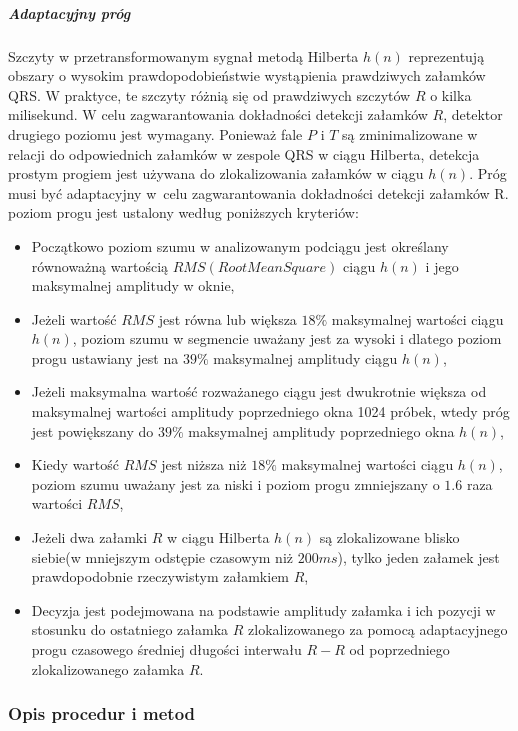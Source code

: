 \documentclass[a4paper, 11pt]{article}
\begin{document}
\subparagraph{Adaptacyjny próg}
Szczyty w przetransformowanym sygnał metodą Hilberta $h(n)$ reprezentują obszary o wysokim prawdopodobieństwie wystąpienia prawdziwych załamków QRS. W praktyce, te szczyty różnią się od prawdziwych szczytów $R$ o kilka milisekund. W celu zagwarantowania dokładności detekcji załamków $R$, detektor drugiego poziomu jest wymagany. Ponieważ fale $P$ i $T$ są zminimalizowane w relacji do odpowiednich załamków w zespole QRS w ciągu Hilberta, detekcja prostym progiem jest używana do zlokalizowania załamków w ciągu $h(n)$. Próg musi być adaptacyjny w~celu zagwarantowania dokładności detekcji załamków R.\\
poziom progu jest ustalony według poniższych kryteriów:
\begin{itemize}
		\item Początkowo poziom szumu w analizowanym podciągu jest określany równoważną wartością $RMS(Root Mean Square)$ ciągu $h(n)$ i jego maksymalnej amplitudy w oknie, 
		\item Jeżeli wartość $RMS$ jest równa lub większa $18\%$ maksymalnej wartości ciągu $h(n)$, poziom szumu w segmencie uważany jest za wysoki i dlatego poziom progu ustawiany jest na $39\%$ maksymalnej amplitudy ciągu $h(n)$,  
		\item Jeżeli maksymalna wartość rozważanego ciągu jest dwukrotnie większa od maksymalnej wartości amplitudy poprzedniego okna 1024 próbek, wtedy próg jest powiększany do $39\%$ maksymalnej amplitudy poprzedniego okna $h(n)$, 
		\item Kiedy wartość $RMS$ jest niższa niż $18\%$ maksymalnej wartości ciągu $h(n)$, poziom szumu uważany jest za niski i poziom progu zmniejszany o $1.6$ raza wartości $RMS$,
		\item Jeżeli dwa załamki $R$ w ciągu Hilberta $h(n)$ są zlokalizowane blisko siebie(w mniejszym odstępie czasowym niż $200ms$), tylko jeden załamek jest prawdopodobnie rzeczywistym załamkiem $R$,
		\item Decyzja jest podejmowana na podstawie amplitudy załamka i ich pozycji w stosunku do ostatniego załamka $R$ zlokalizowanego za pomocą adaptacyjnego progu czasowego średniej długości interwału $R-R$ od poprzedniego zlokalizowanego załamka $R$.
\end{itemize}

\subsubsection{Opis procedur i metod}
\label{sec:rs:procs}
\end{document}

